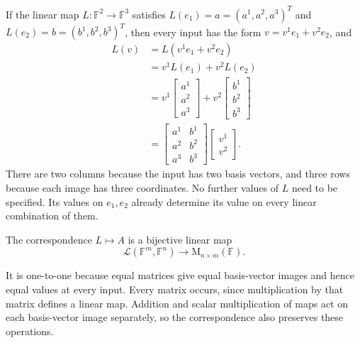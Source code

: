 \begin{example}
  \label{ex:linear-algebra-i:two-basis-images-matrix}
  \begin{pendingreview}
  If the linear map \(L:\mathbb F^2\to\mathbb F^3\) satisfies
  \(L(e_1)=a=(a^1,a^2,a^3)^T\) and
  \(L(e_2)=b=(b^1,b^2,b^3)^T\), then
  every input has the form \(v=v^1e_1+v^2e_2\), and
  \[
    \begin{aligned}
      L(v)&=L(v^1e_1+v^2e_2)\\
        &=v^1L(e_1)+v^2L(e_2)\\
        &=v^1\begin{bmatrix}a^1\\a^2\\a^3\end{bmatrix}
          +v^2\begin{bmatrix}b^1\\b^2\\b^3\end{bmatrix}\\
        &=\begin{bmatrix}a^1&b^1\\a^2&b^2\\a^3&b^3\end{bmatrix}
          \begin{bmatrix}v^1\\v^2\end{bmatrix}.
    \end{aligned}
  \]
  There are two columns because the input has two basis vectors, and three
  rows because each image has three coordinates. No further values of
  \(L\) need to be specified. Its values on \(e_1,e_2\) already determine
  its value on every linear combination of them.
  \end{pendingreview}
\end{example}

The correspondence \(L\mapsto A\) is a bijective linear map
\[
  \mathcal L(\mathbb F^m,\mathbb F^n)
    \longrightarrow \mathrm M_{n\times m}(\mathbb F).
\]
\begin{pendingreview}
It is one-to-one because equal matrices give equal basis-vector images and
hence equal values at every input. Every matrix occurs, since multiplication
by that matrix defines a linear map. Addition and scalar multiplication of
maps act on each basis-vector image separately, so the correspondence also
preserves these operations.
\end{pendingreview}

